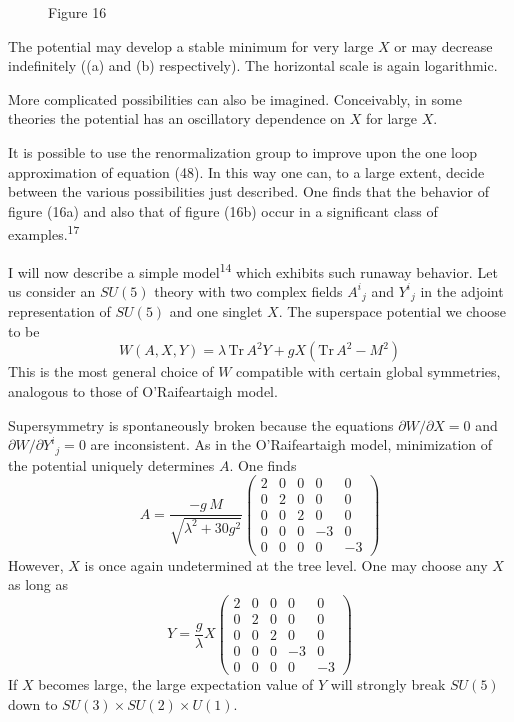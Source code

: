 \begin{figure}[h]
\centering

\caption*{Figure 16}
\end{figure}

The potential may develop a stable minimum for very large $X$ or may
decrease indefinitely ((a) and (b) respectively). The horizontal
scale is again logarithmic.

More complicated possibilities can also be imagined. Conceivably,
in some theories the potential has an oscillatory dependence
on $X$ for large $X$.

It is possible to use the renormalization group to improve upon
the one loop approximation of equation (48). In this way one can,
to a large extent, decide between the various possibilities just
described. One finds that the behavior of figure (16a) and also
that of figure (16b) occur in a significant class of examples.\textsuperscript{17}

I will now describe a simple model\textsuperscript{14} which exhibits such runaway
behavior. Let us consider an $SU(5)$ theory with two complex
fields $A^i{}_j$ and $Y^i{}_j$ in the adjoint representation of $SU(5)$ and one
singlet $X$. The superspace potential we choose to be
\begin{equation}
W(A,X,Y) = \lambda \,\mathrm{Tr}\, A^2Y + gX \left(\mathrm{Tr}\, A^2 - M^2\right)
\tag{49}
\end{equation}
This is the most general choice of $W$ compatible with certain global
symmetries, analogous to those of O'Raifeartaigh model.

Supersymmetry is spontaneously broken because the equations
$\partial W/\partial X = 0$ and $\partial W/\partial Y^i{}_j = 0$ are inconsistent. As in the O'Raifeartaigh
model, minimization of the potential uniquely determines $A$. One
finds
\begin{equation}
A = \frac{-g\, M}{\sqrt{\lambda^2 + 30g^2}}
\begin{pmatrix}
2 & 0 & 0 & 0 & 0 \\
0 & 2 & 0 & 0 & 0 \\
0 & 0 & 2 & 0 & 0 \\
0 & 0 & 0 & -3 & 0 \\
0 & 0 & 0 & 0 & -3
\end{pmatrix}
\tag{50}
\end{equation}
However, $X$ is once again undetermined at the tree level. One may
choose any $X$ as long as
\begin{equation}
Y = \frac{g}{\lambda} X
\begin{pmatrix}
2 & 0 & 0 & 0 & 0 \\
0 & 2 & 0 & 0 & 0 \\
0 & 0 & 2 & 0 & 0 \\
0 & 0 & 0 & -3 & 0 \\
0 & 0 & 0 & 0 & -3
\end{pmatrix}
\tag{51}
\end{equation}
If $X$ becomes large, the large expectation value of $Y$ will strongly
break $SU(5)$ down to $SU(3) \times SU(2) \times U(1)$.

